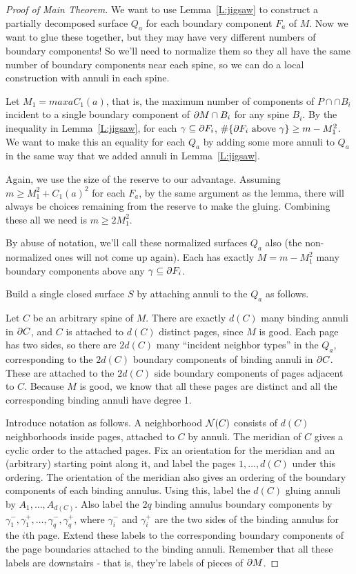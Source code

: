 \begin{proof}[Proof of Main Theorem]

We want to use Lemma~\ref{L:jigsaw} to construct a partially decomposed surface
$Q_a$ for each boundary component $F_a$ of $M$. Now we want to glue these
together, but they may have very different numbers of boundary components! So
we'll need to normalize them so they all have the same number of boundary
components near each spine, so we can do a local construction with annuli in
each spine.

Let $M_1 = max a C_1(a)$, that is, the maximum number of components of $P \cap
\cap B_i$ incident to a single boundary component of $\partial M \cap B_i$ for any
spine $B_i$. By the inequality in Lemma~\ref{L:jigsaw}, for each $\gamma \subseteq
\partial F_i$, $\#\{\partial F_i \text{ above } \gamma\} \geq m - M_1^2$. We want to make
this an equality for each $Q_a$ by adding some more annuli to $Q_a$ in the same
way that we added annuli in Lemma~\ref{L:jigsaw}.

Again, we use the size of the reserve to our advantage. Assuming $m\geq M_1^2
+ C_1(a)^2$ for each $F_a$, by the same argument as the lemma, there will
always be choices remaining from the reserve to make the gluing. Combining
these all we need is $m\geq 2M_1^2$.

By abuse of notation, we'll call these normalized surfaces $Q_a$ also (the
non-normalized ones will not come up again). Each has exactly $M = m - M_1^2$
many boundary components above any $\gamma \subseteq \partial F_i$.

Build a single closed surface $S$ by attaching annuli to the $Q_a$ as follows.

Let $C$ be an arbitrary spine of $M$. There are exactly $d(C)$ many binding
annuli in $\partial C$, and $C$ is attached to $d(C)$ distinct pages, since $M$ is
good. Each page has two sides, so there are $2d(C)$ many ``incident neighbor
types'' in the $Q_a$, corresponding to the $2d(C)$ boundary components of
binding annuli in $\partial C$. These are attached to the $2d(C)$ side boundary
components of pages adjacent to $C$.  Because $M$ is good, we know that all
these pages are distinct and all the corresponding binding annuli have degree
1.

Introduce notation as follows. A neighborhood $\mathcal{N}(C)$ consists of $d(C)$
neighborhoods inside pages, attached to $C$ by annuli. The meridian of $C$
gives a cyclic order to the attached pages.  Fix an orientation for the
meridian and an (arbitrary) starting point along it, and label the pages $1,
\dots, d(C)$ under this ordering.  The orientation of the meridian also gives
an ordering of the boundary components of each binding  annulus.  Using this,
label the $d(C)$ gluing annuli by $A_1,\dots,A_{d(C)}$. Also label the $2q$
binding annulus boundary components by $\gamma_1^-,\gamma_1^+,\dots,
\gamma_q^-,\gamma_q^+$, where $\gamma_i^-$ and $\gamma_i^+$ are the two sides
of the binding annulus for the $i$th page.  Extend these labels to the
corresponding boundary components of the page boundaries attached to the
binding annuli.  Remember that all these labels are downstairs - that is,
they're labels of pieces of $\partial M$.


\end{proof}
